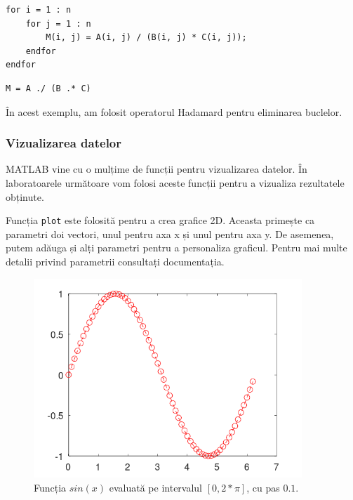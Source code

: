 \documentclass{exam}
\newcommand{\octavescript}[2]{
	
}
\begin{document}
\begin{lstlisting}
for i = 1 : n
	for j = 1 : n
		M(i, j) = A(i, j) / (B(i, j) * C(i, j));
	endfor
endfor
\end{lstlisting}

\begin{lstlisting}
M = A ./ (B .* C)
\end{lstlisting}

\par În acest exemplu, am folosit operatorul Hadamard pentru eliminarea buclelor.

\subsubsection{Vizualizarea datelor}

\par MATLAB vine cu o mulțime de funcții pentru vizualizarea datelor. În
laboratoarele următoare vom folosi aceste funcții pentru a vizualiza rezultatele
obținute.

\par Funcția \verb|plot| este folosită pentru a crea grafice 2D. Aceasta
primește ca parametri doi vectori, unul pentru axa x și unul pentru axa y. De
asemenea, putem adăuga și alți parametri pentru a personaliza graficul. Pentru
mai multe detalii privind parametrii consultați documentația.

\octavescript{./src/plot1.m}{}

\begin{figure}[ht]
	\centering
	\includegraphics[width=0.9\textwidth]{plot1}
	\caption{Funcția $sin(x)$ evaluată pe intervalul $[0, 2 * \pi]$, cu pas $0.1$.}
\end{figure}
\end{document}
